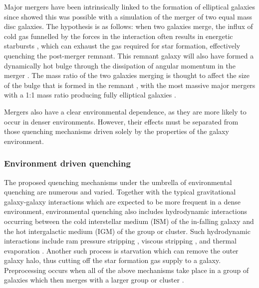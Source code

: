 \documentclass[useAMS,usenatbib]{mn2e}
\begin{document}
Major mergers have been intrinsically linked to the formation of elliptical galaxies since \citet{toomre72} showed this was possible with a simulation of the merger of two equal mass disc galaxies. The hypothesis is as follows: when two galaxies merge, the influx of cold gas funnelled by the forces in the interaction often results in energetic starbursts \citep{mihos94, mihos96, hopkins06d, hopkins08a, hopkins08b, snyder11, hayward14, sparre16}, which can exhaust the gas required for star formation, effectively quenching the post-merger remnant. This remnant galaxy will also have formed a dynamically hot bulge through the dissipation of angular momentum in the merger \citep{toomre77, walker96, kormendy04, hopkins11c, martig12}. The mass ratio of the two galaxies merging is thought to affect the size of the bulge that is formed in the remnant \citep{cox08, hopkins09c, tonini16}, with the most massive major mergers with a 1:1 mass ratio producing fully elliptical galaxies \citep{toomre72, barnes96, mihos96, kauffmann96, pontzen16}.

Mergers also have a clear environmental dependence, as they are more likely to occur in denser environments. However, their effects must be separated from those quenching mechanisms driven solely by the properties of the galaxy environment. 

\subsubsection{Environment driven quenching}\label{sec:envquench}

The proposed quenching mechanisms under the umbrella of environmental quenching are numerous and varied. Together with the typical gravitational galaxy-galaxy interactions \citep{moore96} which are expected to be more frequent in a dense environment, environmental quenching also includes hydrodynamic interactions occurring between the cold interstellar medium (ISM) of the in-falling galaxy and the hot intergalactic medium (IGM) of the group or cluster. Such hydrodynamic interactions include ram pressure stripping \citep{gunngott72}, viscous stripping \citep{nulsen82}, and thermal evaporation \citep[a rapid rise in temperature of the ISM due to contact with the IGM;][]{cowie77}. Another such process is starvation \citep[also called strangulation;][]{larson80} which can remove the outer galaxy halo, thus cutting off the star formation gas supply to a galaxy. Preprocessing occurs when all of the above mechanisms take place in a group of galaxies which then merges with a larger group or cluster \citep{dressler04}. 
\end{document}
